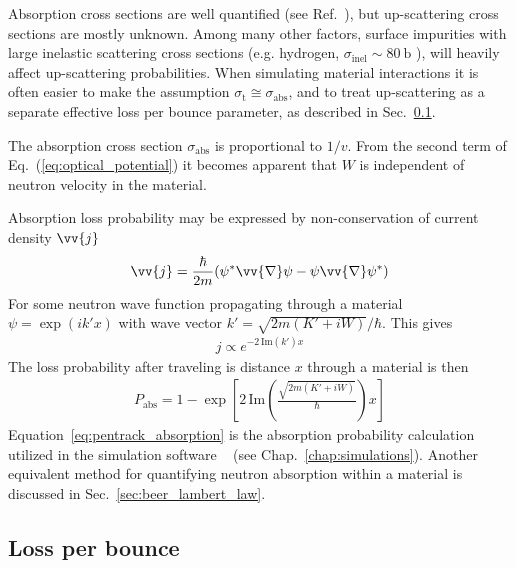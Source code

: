 Absorption cross sections are well quantified (see Ref.~\cite{nist_neutron_cross_sections}), but up-scattering cross sections are mostly unknown. Among many other factors, surface impurities with large inelastic scattering cross sections (e.g. hydrogen, $\sigma_\text{inel} \sim \qty{80}{\barn}$ \cite{nist_neutron_cross_sections}), will heavily affect up-scattering probabilities. When simulating \ucn material interactions it is often easier to make the assumption $\sigma_{\text{t}} \cong \sigma_\text{abs}$, and to treat up-scattering as a separate effective loss per bounce parameter, as described in Sec.~\ref{sec:loss_per_bounce}.

The absorption cross section $\sigma_\text{abs}$ is proportional to $1/v$. From the second term of Eq.~(\ref{eq:optical_potential}) it becomes apparent that $W$ is independent of neutron velocity in the material.

Absorption loss probability may be expressed by non-conservation of current density $\vv{j}$ \cite{golubUCN}
%
\begin{gather}
    \vv{j} = \frac{\hbar}{2m} ( \psi^* \vv{\nabla} \psi - \psi \vv{\nabla}\psi^*)
\end{gather}
%
For some neutron wave function propagating through a material $\psi = \exp (ik'x)$ with wave vector $k'=\sqrt{2m(K'+iW)}/\hbar$. This gives
%
\begin{gather}
    j \propto e^{-2\,\text{Im}(k')x}
\end{gather}
%
The loss probability after traveling is distance $x$ through a material is then
%
\begin{gather}
    P_\text{abs}= 1 - \exp \left[2\,\text{Im}\left( \frac{\sqrt{2m(K'+iW)}}{\hbar}\right)x \right]\label{eq:pentrack_absorption}
\end{gather}
%
Equation~\ref{eq:pentrack_absorption} is the absorption probability calculation utilized in the \ucn simulation software \pentrack~\cite{schreyer_pentrack} (see Chap.~\ref{chap:simulations}). Another equivalent method for quantifying neutron absorption within a material is discussed in Sec.~\ref{sec:beer_lambert_law}.


\subsection{Loss per bounce}\label{sec:loss_per_bounce}


